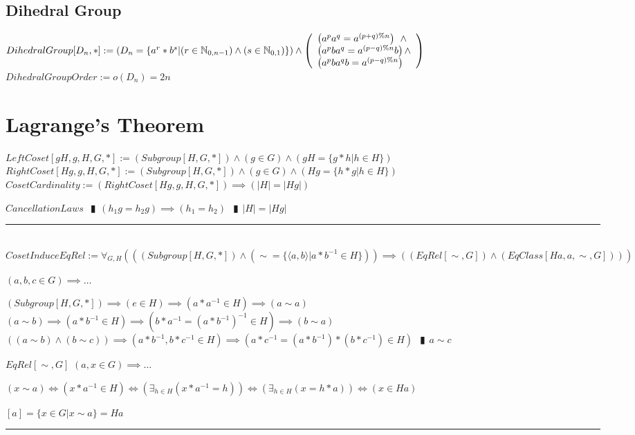 \documentclass{book}
\newcommand{\abr}{:=}
\newcommand{\pipe}{$\phantom{(}\vrectangleblack\phantom{)}$}
\newcommand{\pr}[1]{\left(#1\right)}
\begin{document}
\subsection{Dihedral Group}
$DihedralGroup[D_n, *] \abr \pr{D_n = \{a^r * b^s | (r \in \mathbb{N}_{0, n - 1}) \land (s \in \mathbb{N}_{0, 1})\}} \land \left(\begin{array}{ll}
  \pr{a^p a^q = a^{(p + q) \% n}} \hfill \land \hfill \\
  \pr{a^p b a^q = a^{(p - q) \% n} b} \hfill \land \hfill \\
  \pr{a^p b a^q b = a^{(p - q) \% n}}
\end{array}\right)$ \\
$DihedralGroupOrder \abr o(D_n) = 2 n$ \\


\section{Lagrange's Theorem}
$LeftCoset[g H, g, H, G, *] \abr (Subgroup[H, G, *]) \land (g \in G) \land (g H = \{g * h | h \in H\})$ \\
$RightCoset[H g, g, H, G, *] \abr (Subgroup[H, G, *]) \land (g \in G) \land (H g = \{h * g | h \in H\})$ \\

$CosetCardinality \abr (RightCoset[H g, g, H, G, *]) \implies (|H| = |H g|)$
\begin{enumerate}
  \lit $CancellationLaws$ \pipe $(h_1 g = h_2 g) \implies (h_1 = h_2)$ \pipe $|H| = |H g|$
\end{enumerate} \vspace{.75mm} \hrule \vspace{.75mm} \ \\ 

$CosetInduceEqRel \abr \forall_{G, H}\pr{\pr{(Subgroup[H, G, *]) \land (\sim = \{\langle a, b \rangle | a * b^{-1} \in H\})} \implies \pr{(EqRel[\sim, G]) \land (EqClass[H a, a, \sim, G])}}$
\begin{enumerate}
  \lit $(a, b, c \in G) \implies \ldots$
  \begin{enumerate}
    \lit $(Subgroup[H, G, *]) \implies (e \in H) \implies (a * a^{-1} \in H) \implies (a \sim a)$
    \lit $(a \sim b) \implies (a * b^{-1} \in H) \implies \pr{b * a^{-1} = (a * b^{-1})^{-1} \in H} \implies (b \sim a)$
    \lit $\pr{(a \sim b) \land (b \sim c)} \implies (a * b^{-1}, b * c^{-1} \in H) \implies \pr{a * c^{-1} = (a * b^{-1}) * (b * c^{-1}) \in H}$ \pipe $a \sim c$
  \end{enumerate}
  \lit $EqRel[\sim, G]$
  \lit $(a, x \in G) \implies \ldots$
  \begin{enumerate}
    \lit $(x \sim a) \iff (x * a^{-1} \in H) \iff \pr{\exists_{h \in H}(x * a^{-1} = h)} \iff \pr{\exists_{h \in H}(x = h * a)} \iff (x \in H a)$
  \end{enumerate}
  \lit $[a] = \{x \in G | x \sim a\} = H a$
\end{enumerate} \vspace{.75mm} \hrule \vspace{.75mm} \ \\ 
\end{document}
